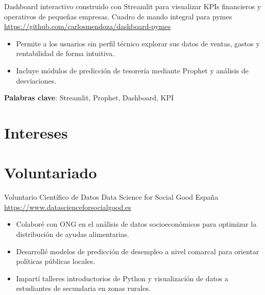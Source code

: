 \documentclass[a4paper, serif, 10pt]{moderncv}
\begin{document}
        {Dashboard interactivo construido con Streamlit para visualizar KPIs financieros y operativos de pequeñas empresas.}
        {Cuadro de mando integral para pymes}
        {\url{https://github.com/carlosmendoza/dashboard-pymes}}
        {}
        {\begin{itemize}
\item Permite a los usuarios sin perfil técnico explorar sus datos de ventas, gastos y rentabilidad de forma intuitiva.
\item Incluye módulos de predicción de tesorería mediante Prophet y análisis de desviaciones.
\end{itemize}
\textbf{Palabras clave}: Streamlit, Prophet, Dashboard, KPI}
\section{Intereses}

\section{Voluntariado}

        {Voluntario Científico de Datos}
        {Data Science for Social Good España}
        {\url{https://www.datascienceforsocialgood.es}}
        {}
        {\begin{itemize}
\item Colaboré con ONG en el análisis de datos socioeconómicos para optimizar la distribución de ayudas alimentarias.
\item Desarrollé modelos de predicción de desempleo a nivel comarcal para orientar políticas públicas locales.
\item Impartí talleres introductorios de Python y visualización de datos a estudiantes de secundaria en zonas rurales.
\end{itemize}}
\end{document}
